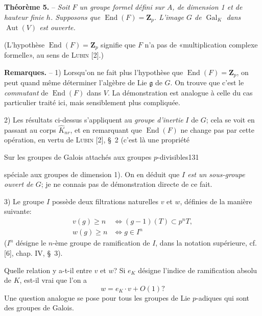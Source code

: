 \textbf{Théorème 5.} -- \textit{Soit $F$ un groupe formel défini sur $A$, de dimension 1 et de hauteur finie $h$. Supposons que $\operatorname{End}(F)=\mathbf Z_p$. L'image $G$ de $\operatorname{Gal}_K$ dans $\operatorname{Aut}(V)$ est ouverte.}

(L'hypothèse $\operatorname{End}(F)=\mathbf Z_p$ signifie que $F$ n'a pas de «multiplication complexe formelle», au sens de \textsc{Lubin} [2].)

\textbf{Remarques.} -- 1) Lorsqu'on ne fait plus l'hypothèse que $\operatorname{End}(F)=\mathbf Z_p$, on peut quand même déterminer l'algèbre de Lie $\mathfrak g$ de $G$. On trouve que c'est le \textit{commutant} de $\operatorname{End}(F)$ dans $V$. La démonstration est analogue à celle du cas particulier traité ici, mais sensiblement plus compliquée.

2) Les résultats ci-dessus s'appliquent au \textit{groupe d'inertie} $I$ de $G$; cela se voit en passant au corps $\widehat K_{nr}$, et en remarquant que $\operatorname{End}(F)$ ne change pas par cette opération, en vertu de \textsc{Lubin} [2], \S\ 2 (c'est là une propriété

Sur les groupes de Galois attachés aux groupes $p$-divisibles\hfill 131

spéciale aux groupes de dimension 1). On en déduit que \textit{$I$ est un sous-groupe ouvert de $G$}; je ne connais pas de démonstration directe de ce fait.

3) Le groupe $I$ possède deux filtrations naturelles $v$ et $w$, définies de la manière suivante:
\[
\begin{aligned}
v(g)\geq n&\Leftrightarrow(g-1)(T)\subset p^nT,\\
w(g)\geq n&\Leftrightarrow g\in I^n
\end{aligned}
\]
($I^n$ désigne le $n$-ème groupe de ramification de $I$, dans la notation supérieure, cf. [6], chap. IV, \S\ 3).

Quelle relation y a-t-il entre $v$ et $w$? Si $e_K$ désigne l'indice de ramification absolu de $K$, est-il vrai que l'on a
\[
w=e_K\cdot v+O(1)?
\]
Une question analogue se pose pour tous les groupes de Lie $p$-adiques qui sont des groupes de Galois.

